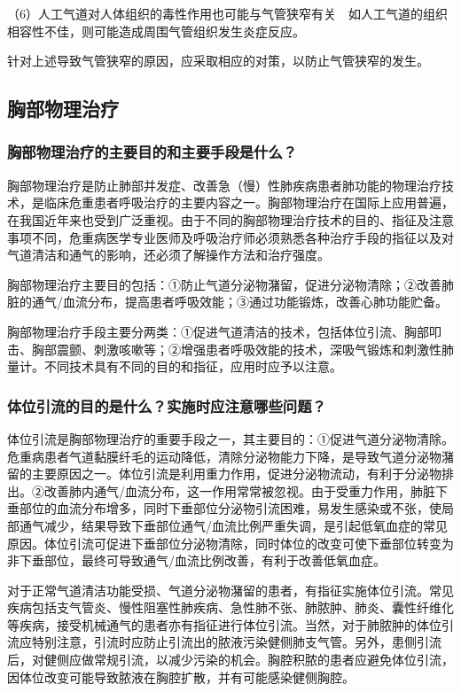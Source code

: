 （6）人工气道对人体组织的毒性作用也可能与气管狭窄有关　如人工气道的组织相容性不佳，则可能造成周围气管组织发生炎症反应。

针对上述导致气管狭窄的原因，应采取相应的对策，以防止气管狭窄的发生。

\subsection{胸部物理治疗}

\subsubsection{胸部物理治疗的主要目的和主要手段是什么？}

胸部物理治疗是防止肺部并发症、改善急（慢）性肺疾病患者肺功能的物理治疗技术，是临床危重患者呼吸治疗的主要内容之一。胸部物理治疗在国际上应用普遍，在我国近年来也受到广泛重视。由于不同的胸部物理治疗技术的目的、指征及注意事项不同，危重病医学专业医师及呼吸治疗师必须熟悉各种治疗手段的指征以及对气道清洁和通气的影响，还必须了解操作方法和治疗强度。

胸部物理治疗主要目的包括：①防止气道分泌物潴留，促进分泌物清除；②改善肺脏的通气/血流分布，提高患者呼吸效能；③通过功能锻炼，改善心肺功能贮备。

胸部物理治疗手段主要分两类：①促进气道清洁的技术，包括体位引流、胸部叩击、胸部震颤、刺激咳嗽等；②增强患者呼吸效能的技术，深吸气锻炼和刺激性肺量计。不同技术具有不同的目的和指征，应用时应予以注意。

\subsubsection{体位引流的目的是什么？实施时应注意哪些问题？}

体位引流是胸部物理治疗的重要手段之一，其主要目的：①促进气道分泌物清除。危重病患者气道黏膜纤毛的运动降低，清除分泌物能力下降，是导致气道分泌物潴留的主要原因之一。体位引流是利用重力作用，促进分泌物流动，有利于分泌物排出。②改善肺内通气/血流分布，这一作用常常被忽视。由于受重力作用，肺脏下垂部位的血流分布增多，同时下垂部位分泌物引流困难，易发生感染或不张，使局部通气减少，结果导致下垂部位通气/血流比例严重失调，是引起低氧血症的常见原因。体位引流可促进下垂部位分泌物清除，同时体位的改变可使下垂部位转变为非下垂部位，最终可导致通气/血流比例改善，有利于改善低氧血症。

对于正常气道清洁功能受损、气道分泌物潴留的患者，有指征实施体位引流。常见疾病包括支气管炎、慢性阻塞性肺疾病、急性肺不张、肺脓肿、肺炎、囊性纤维化等疾病，接受机械通气的患者亦有指征进行体位引流。当然，对于肺脓肿的体位引流应特别注意，引流时应防止引流出的脓液污染健侧肺支气管。另外，患侧引流后，对健侧应做常规引流，以减少污染的机会。胸腔积脓的患者应避免体位引流，因体位改变可能导致脓液在胸腔扩散，并有可能感染健侧胸腔。

